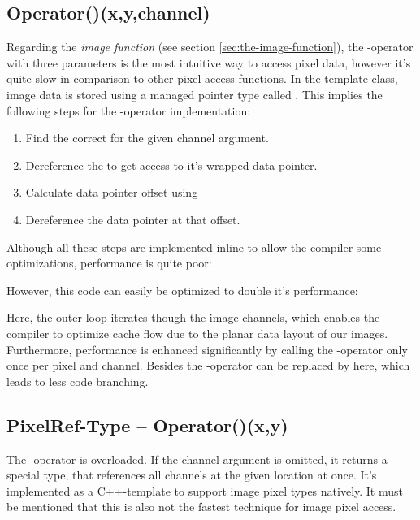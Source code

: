 \subsection{Operator()(x,y,channel)\label{sec:x-y-channel-operator}}
Regarding the \emph{image function} (see section \ref{sec:the-image-function}), the \inlinecode{()}-operator with three parameters is the most intuitive way to access pixel data, however it's quite slow in comparison to other pixel access functions. In the  template class, image data is stored using a managed pointer type called  . This implies the following steps for the -operator implementation:
\begin{enumerate}
\item Find the correct  for the given channel argument.
\item Dereference the  to get access to it's wrapped data pointer.
\item Calculate data pointer offset using 
\item Dereference the data pointer at that offset.
\end{enumerate}
Although all these steps are implemented inline to allow the compiler some optimizations, performance is quite poor:


However, this code can easily be optimized to double it's performance:


Here, the outer loop iterates though the image channels, which enables the compiler to optimize cache flow due to the planar data layout of our images. Furthermore, performance is enhanced significantly by calling the -operator only once per pixel and channel. Besides the -operator can be replaced by  here, which leads to less code branching.

\subsection{PixelRef-Type -- Operator()(x,y)}

The \inlinecode{()}-operator is overloaded. If the channel argument is omitted, it returns a special   type, that references all channels at the given location at once. It's implemented as a C++-template to support image pixel types natively. It must be mentioned that this is also not the fastest technique for image pixel access.

